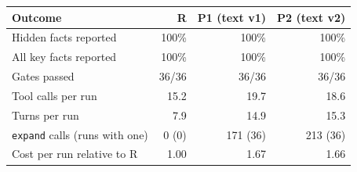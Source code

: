 \begin{tabular}{lrrr}
\toprule
Outcome & R & P1 (text v1) & P2 (text v2) \\
\midrule
Hidden facts reported & 100\% & 100\% & 100\% \\
All key facts reported & 100\% & 100\% & 100\% \\
Gates passed & 36/36 & 36/36 & 36/36 \\
Tool calls per run & 15.2 & 19.7 & 18.6 \\
Turns per run & 7.9 & 14.9 & 15.3 \\
\texttt{expand} calls (runs with one) & 0 (0) & 171 (36) & 213 (36) \\
Cost per run relative to R & 1.00 & 1.67 & 1.66 \\
\bottomrule
\end{tabular}
